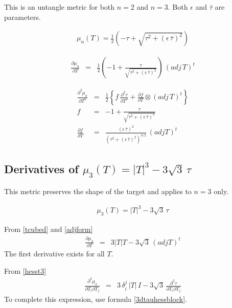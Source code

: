 \documentclass{report}
\begin{document}
\noindent This is an untangle metric for both $n=2$ and $n=3$. Both 
$\epsilon$ and $\bar{\tau}$ are parameters. \newline

\begin{eqnarray} 
\mu_n(T) = \frac{1}{2} \left( - \tau + \sqrt{\tau^2 + \left(\epsilon \, \bar{\tau} \right)^2} \right)
\end{eqnarray}

\begin{eqnarray}
\frac{\partial \mu_n}{\partial T} & = & \frac{1}{2} \left( -1 + \frac{\tau}{\sqrt{\tau^2 + \left(\epsilon \, \bar{\tau} \right)^2}} \right) \, (adj \, T)^t 
\end{eqnarray}

\begin{eqnarray}
\frac{\partial^2 \mu_n}{\partial T^2} & = & \frac{1}{2} \left\{ f \, \frac{\partial^2 \tau}{\partial T^2} + \frac{\partial f}{\partial T} \otimes (adj \, T)^t \right\} \\
f & = & -1 +  \frac{\tau}{\sqrt{\tau^2 + \left(\epsilon \, \bar{\tau} \right)^2}} \\
\frac{\partial f}{\partial T} & = & \frac{(\epsilon \, \bar{\tau})^2}{\left(\tau^2 + \left(\epsilon \, \bar{\tau} \right)^2 \right)^{3/2}} \, (adj T)^t
\end{eqnarray}


\subsection{Derivatives of $\mu_3(T) = |T|^3 - 3 \sqrt{3} \, \tau$}

\noindent This metric preserves the shape of the target and applies 
to $n=3$ only. \newline

\begin{eqnarray}
\mu_3 (T) = |T|^3 - 3 \sqrt{3} \, \tau
\end{eqnarray}

\noindent From \ref{tcubed} and \ref{adjform}
\begin{eqnarray}
\frac{\partial \mu_3}{\partial T} & = & 3 |T| T - 3 \sqrt{3} \, (adj T)^t
\end{eqnarray}
The first derivative exists for all $T$. \newline

\noindent From \ref{hesst3}
\begin{eqnarray}
\frac{\partial^2 \mu_3}{\partial T_i \partial T_j} & = & 3 \, \delta_i^j \, |T| \, I - 3 \sqrt{3} \, \frac{\partial^2 \tau}{\partial T_i \partial T_j}
\end{eqnarray}
To complete this expression, use formula \ref{3dtauhessblock}. \newline
\end{document}
